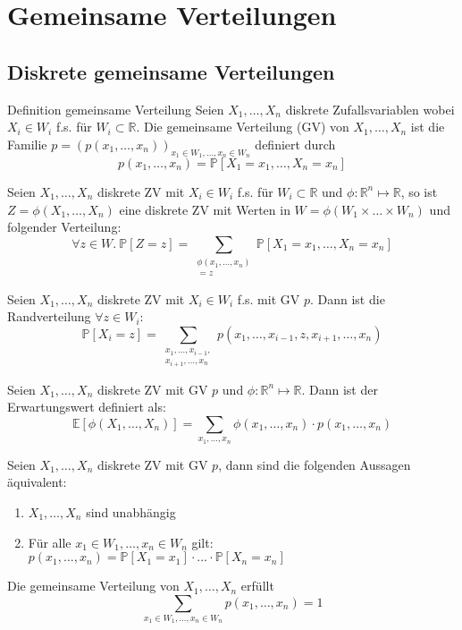 \documentclass[a4paper,10pt]{article}
\def\R{\mathbb{R}}
\def\P{\mathbb{P}}
\def\E{\mathbb{E}}
\begin{document}
\section{Gemeinsame Verteilungen}
\subsection{Diskrete gemeinsame Verteilungen}
\begin{subbox}{Definition gemeinsame Verteilung}
	Seien \(X_1, \ldots, X_n\) diskrete Zufallsvariablen wobei \(X_i \in W_i\) f.s. für \(W_i \subset \R\). Die gemeinsame Verteilung (GV) von \(X_1, \ldots, X_n\) ist die Familie \(p = (p(x_1, \ldots, x_n))_{x_1 \in W_1, \ldots, x_n \in W_n}\) definiert durch
	\[p(x_1, \ldots, x_n) = \P[X_1 = x_1, \ldots, X_n = x_n]\]
\end{subbox}

Seien \(X_1,\ldots,X_n\) diskrete ZV mit \(X_i \in W_i\) f.s. für \(W_i \subset \R\) und \(\phi: \R^n \mapsto \R\), so ist \(Z = \phi(X_1, \ldots, X_n)\) eine diskrete ZV mit Werten in \(W = \phi(W_1 \times \ldots \times W_n)\) und folgender Verteilung:
\[\forall z \in W. \ \P[Z = z] = \sum_{\substack{\phi(x_1, \ldots, x_n) \\= z}} \P[X_1 = x_1, \ldots, X_n = x_n]\]

Seien \(X_1,\ldots,X_n\) diskrete ZV mit \(X_i \in W_i\) f.s. mit GV \(p\). Dann ist die Randverteilung \(\forall z \in W_i\):
\[\P[X_i = z] = \sum_{\substack{x_1, \ldots, x_{i-1}, \\x_{i+1},\ldots,x_n}} p(x_1, \ldots, x_{i-1}, z, x_{i+1},\ldots,x_n)\]

Seien \(X_1,\ldots,X_n\) diskrete ZV mit GV \(p\) und \(\phi : \R^n \mapsto \R\). Dann ist der Erwartungswert definiert als:
\[\E[\phi(X_1, \ldots, X_n)] = \sum_{x_1,\ldots,x_n} \phi(x_1,\ldots,x_n) \cdot p(x_1,\ldots,x_n)\]

Seien \(X_1,\ldots,X_n\) diskrete ZV mit GV \(p\), dann sind die folgenden Aussagen äquivalent:
\begin{enumerate}
	\item \(X_1,\ldots,X_n\) sind unabhängig
	\item Für alle \(x_1 \in W_1, \ldots, x_n \in W_n\) gilt:
	      \(p(x_1,\ldots,x_n) = \P[X_1 = x_1] \cdot \ldots \cdot \P[X_n = x_n]\)
\end{enumerate}

Die gemeinsame Verteilung von \(X_1, \ldots, X_n\) erfüllt
\[\sum_{x_1\in W_1, \ldots, x_n \in W_n} p(x_1, \ldots, x_n) = 1\]
\end{document}
